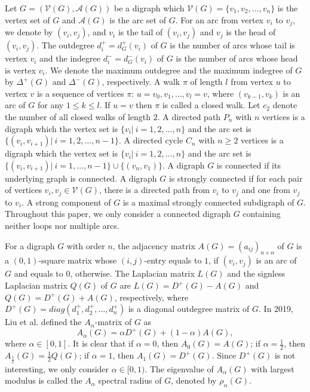 \documentclass[11pt]{article}
\begin{document}
Let $G=(\mathcal{V}(G),\mathcal{A}(G))$ be a digraph which $\mathcal{V}(G)=\{v_1,v_2,\ldots,v_n\}$ is the vertex set of $G$ and $\mathcal{A}(G)$ is the arc set of $G$. For an arc from vertex $v_i$ to $v_j$, we denote by $(v_i, v_j)$, and $v_i$ is the tail of $(v_i, v_j)$ and $v_j$ is the head of $(v_i, v_j)$. The outdegree $d_i^+=d_G^+(v_i)$ of $G$ is the number of arcs whose tail is vertex $v_i$ and the indegree $d_i^-=d_G^-(v_i)$ of $G$ is the number of arcs whose head is vertex $v_i$. We denote the maximum outdegree and the maximum indegree of $G$ by $\Delta^+(G)$ and $\Delta^-(G)$, respectively. A walk $\pi$ of length $l$ from vertex $u$ to vertex $v$ is a sequence of vertices $\pi$: $u=v_0,v_1,\ldots,v_l=v$, where $(v_{k-1},v_k)$ is an arc of $G$ for any $1\leq k\leq l$. If $u=v$ then $\pi$ is called a closed walk. Let $c_2$ denote the number of all closed walks of length $2$. A directed path $P_{n}$ with $n$ vertices is a digraph which the vertex set is $\{v_i|\ i=1,2,\ldots,n\}$ and the arc set is $\{(v_i,v_{i+1})|\ i=1,2,\ldots,n-1\}$. A directed cycle $C_n$ with $n\geq2$ vertices is a digraph which the vertex set is $\{v_i|\ i=1,2,\ldots,n\}$ and the arc set is $\{(v_i,v_{i+1})|\ i=1,\ldots,n-1\}\cup\{(v_n,v_1)\}$. A digraph $G$ is connected if its underlying graph is connected. A digraph $G$ is strongly connected if for each pair of vertices $v_i,v_j\in\mathcal{V}(G)$, there is a directed path from $v_i$ to $v_j$ and one from $v_j$ to $v_i$. A strong component of $G$ is a maximal strongly connected subdigraph of $G$. Throughout this paper, we only consider a connected digraph $G$ containing neither loops nor multiple arcs.

For a digraph $G$ with order $n$, the adjacency matrix $A(G)=(a_{ij})_{n\times n}$ of $G$ is a $(0,1)$-square matrix whose $(i,j)$-entry equals to $1$, if $(v_i, v_j)$ is an arc of $G$ and equals to $0$, otherwise. The Laplacian matrix $L(G)$ and the signless Laplacian matrix $Q(G)$ of $G$ are $L(G)=D^+(G)-A(G)$ and $Q(G)=D^+(G)+A(G)$, respectively, where $D^+(G)=diag(d_1^+,d_2^+,\ldots,d_n^+)$ is a diagonal outdegree matrix of $G$. In 2019, Liu et al. \cite{LiWC} defined the $A_\alpha$-matrix of $G$ as
$$A_\alpha(G)=\alpha D^+(G)+(1-\alpha)A(G),$$
where $\alpha\in[0,1]$. It is clear that if $\alpha=0$, then $A_0(G)=A(G)$; if $\alpha=\frac{1}{2}$, then $A_\frac{1}{2}(G)=\frac{1}{2}Q(G)$; if $\alpha=1$, then $A_1(G)=D^+(G)$. Since $D^+(G)$ is not interesting, we only consider $\alpha\in[0,1)$. The eigenvalue of $A_\alpha(G)$ with largest modulus is called the $A_\alpha$ spectral radius of $G$, denoted by $\rho_\alpha(G)$.
\end{document}
